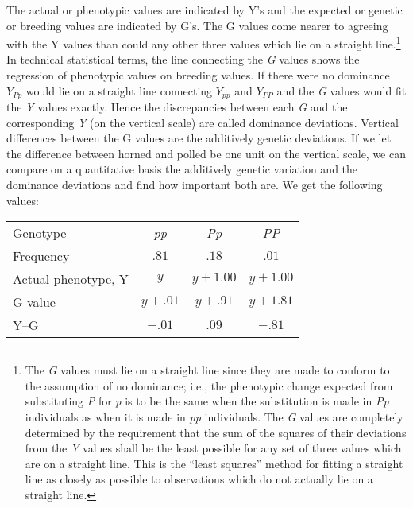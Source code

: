 The actual or phenotypic values are indicated by Y's and the expected or
genetic or breeding values are indicated by G's. The G values come nearer
to agreeing with the Y values than could any other three values which lie on
a straight line.\footnote{The \textit{G} values must lie on a straight line
since they are made to conform to the assumption of no dominance; i.e., the
phenotypic change expected from substituting \textit{P} for \textit{p} is to
be the same when the substitution is made in \textit{Pp} individuals as when
it is made in \textit{pp} individuals. The \textit{G} values are completely
determined by the requirement that the sum of the squares of their deviations
from the \textit{Y} values shall be the least possible for any set of three
values which are on a straight line. This is the ``least squares'' method for
fitting a straight line as closely as possible to observations which do not
actually lie on a straight line.} In technical statistical terms, the line
connecting the \textit{G} values shows the regression of phenotypic values on
breeding values. If there were no dominance $Y_{Pp}$ would lie on a straight
line connecting $Y_{pp}$ and $Y_{PP}$ and the \textit{G} values would fit the
\textit{Y} values exactly. Hence the discrepancies between each \textit{G} and
the corresponding \textit{Y} (on the vertical scale) are called dominance
deviations. Vertical differences between the G values are the additively genetic
deviations. If we let the difference between horned and polled be one unit on
the vertical scale, we can compare on a quantitative basis the additively
genetic variation and the dominance deviations and find how important both are.
We get the following values:

\begin{table}[htbp]
	\centering
	\begin{tabular}{lccc}
		Genotype				& \textit{pp}	& \textit{Pp}	& \textit{PP} \\
		Frequency				& $.81$			& $.18$			& $.01$ \\
		Actual phenotype, Y		& $y$			& $y+1.00$		& $y+1.00$ \\
		G value					& $y+.01$		& $y+.91$		& $y+1.81$ \\
		Y--G					& $-.01$		& $.09$			& $-.81$ \\
	\end{tabular}
\end{table}

